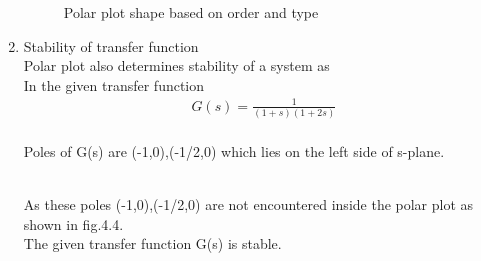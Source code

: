 \begin{enumerate}[label=\thesection.\arabic*.,ref=\thesection.\theenumi]
\begin{figure}
    \caption{Polar plot shape based on order and type}
    \label{fig:Graph}
\end{figure}
\item
Stability of transfer function\\
Polar plot also  determines stability of a system as\\
In the given transfer function\\
\begin{align}
G(s) = \frac{1}{(1+s)(1+2s)}
\end{align}
\\
Poles of G(s) are (-1,0),(-1/2,0) which lies on the left side of s-plane.

\\
As these poles (-1,0),(-1/2,0) are not encountered inside the polar plot as shown in fig.4.4.\\
The given transfer function G(s) is stable.






\end{enumerate}
